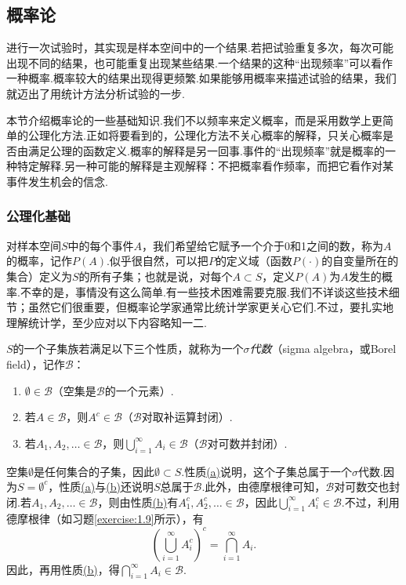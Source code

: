 \subsection{概率论}\label{sec:1.2}
进行一次试验时，其实现是样本空间中的一个结果.若把试验重复多次，每次可能出现不同的结果，也可能重复出现某些结果.一个结果的这种“出现频率”可以看作一种概率.概率较大的结果出现得更频繁.如果能够用概率来描述试验的结果，我们就迈出了用统计方法分析试验的一步.

本节介绍概率论的一些基础知识.我们不以频率来定义概率，而是采用数学上更简单的公理化方法.正如将要看到的，公理化方法不关心概率的解释，只关心概率是否由满足公理的函数定义.概率的解释是另一回事.事件的“出现频率”就是概率的一种特定解释.另一种可能的解释是主观解释：不把概率看作频率，而把它看作对某事件发生机会的信念.



\subsubsection{公理化基础}\label{sec:1.2.1}
对样本空间$S$中的每个事件$A$，我们希望给它赋予一个介于0和1之间的数，称为$A$的概率，记作$P(A)$.似乎很自然，可以把$P$的定义域（函数$P(\cdot)$的自变量所在的集合）定义为$S$的所有子集；也就是说，对每个$A\subset S$，定义$P(A)$为$A$发生的概率.不幸的是，事情没有这么简单.有一些技术困难需要克服.我们不详谈这些技术细节；虽然它们很重要，但概率论学家通常比统计学家更关心它们.不过，要扎实地理解统计学，至少应对以下内容略知一二.
\begin{definition}\label{def:1.2.1}
$S$的一个子集族若满足以下三个性质，就称为一个\emph{$\sigma$代数}（sigma algebra，或Borel field），记作$\mathscr B$：
\begin{enumerate}
\item[(a)]\label{itm:def:1.2.1:a} $\emptyset\in\mathscr B$（空集是$\mathscr B$的一个元素）.
\item[(b)]\label{itm:def:1.2.1:b} 若$A\in\mathscr B$，则$A^c\in\mathscr B$（$\mathscr B$对取补运算封闭）.
\item[(c)] 若$A_1,A_2,\ldots\in\mathscr B$，则$\bigcup_{i=1}^{\infty}A_i\in\mathscr B$（$\mathscr B$对可数并封闭）.
\end{enumerate}
\end{definition}
空集$\emptyset$是任何集合的子集，因此$\emptyset\subset S$.性质\hyperref[itm:def:1.2.1:a]{(a)}说明，这个子集总属于一个$\sigma$代数.因为$S=\emptyset^c$，性质\hyperref[itm:def:1.2.1:a]{(a)}与\hyperref[itm:def:1.2.1:b]{(b)}还说明$S$总属于$\mathscr B$.此外，由德摩根律可知，$\mathscr B$对可数交也封闭.若$A_1,A_2,\ldots\in\mathscr B$，则由性质\hyperref[itm:def:1.2.1:b]{(b)}有$A_1^c,A_2^c,\ldots\in\mathscr B$，因此$\bigcup_{i=1}^{\infty}A_i^c\in\mathscr B$.不过，利用德摩根律（如习题\ref{exercise:1.9}所示），有
\begin{equation}\label{eq:1.2.1}
\left(\bigcup_{i=1}^{\infty}A_i^c\right)^c=\bigcap_{i=1}^{\infty}A_i.
\end{equation}
因此，再用性质\hyperref[itm:def:1.2.1:b]{(b)}，得$\bigcap_{i=1}^{\infty}A_i\in\mathscr B$.

